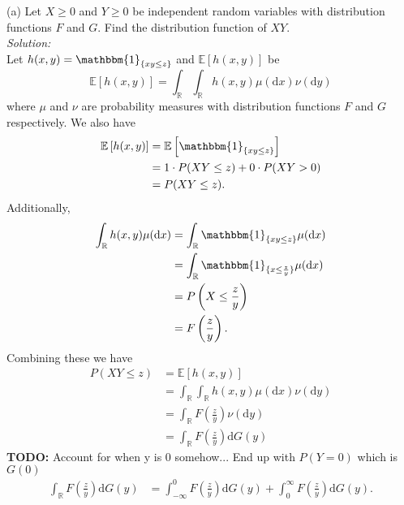 \documentclass[10pt]{amsart}
\newcommand{\D}{\mathrm{d}}
\begin{document}
  (a) Let $X \geq 0$ and $Y \geq 0$  be independent random variables with distribution functions $F$ and $G$. Find the distribution function of $XY$. \\
\textit{Solution:} \\
Let $h(x, y) = \mathbbm{1}_{\{xy \leq z\}}$ and $\mathbb E \left[ h(x,y) \right]$ be
$$
\mathbb E \left[ h(x,y) \right] = \int_{\mathbb R} \int_{\mathbb R} h(x, y) \mu(\D x) \nu(\D y)
$$
where $\mu$ and $\nu$ are probability measures with distribution functions $F$ and $G$ respectively.
We also have 
\begin{align*}
\mathbb E \left[ h(x,y) \right]
	&= \mathbb E \left[ \mathbbm{1}_{\{xy \leq z\}} \right] \\
	&= 1 \cdot P(XY \leq z) + 0 \cdot P(XY > 0) \\
	&= P(XY \leq z).
\end{align*}
Additionally,
\begin{align*}
\int_{\mathbb R} h(x, y) \mu(\D x) 
	&= \int_{\mathbb R} \mathbbm{1}_{\{xy \leq z\}} \mu(\D x) \\
	&= \int_{\mathbb R} \mathbbm{1}_{\{x \leq \frac z y\}} \mu(\D x) \\
	&= P\left( X \leq \frac z y \right) \\
	&= F\left(\frac z y \right).
\end{align*}
Combining these we have
\begin{align*}
P\left( XY \leq z \right)
	&= \mathbb E \left[ h(x,y) \right] \\
	&= \int_{\mathbb R} \int_{\mathbb R} h(x, y) \mu(\D x) \nu(\D y) \\
	&= \int_{\mathbb R} F\left(\frac z y \right) \nu(\D y) \\
	&= \int_{\mathbb R} F\left(\frac z y \right) \D G(y)
\end{align*}
\textbf{TODO:} Account for when y is 0 somehow...
End up with $P(Y = 0)$ which is $G(0)$
\begin{align*}
\int_{\mathbb R} F\left(\frac z y \right) \D G(y)
	&= \int_{-\infty}^0 F\left(\frac z y \right) \D G(y) + \int_{0}^{\infty} F\left(\frac z y \right) \D G(y).
\end{align*}
\\
\end{document}
